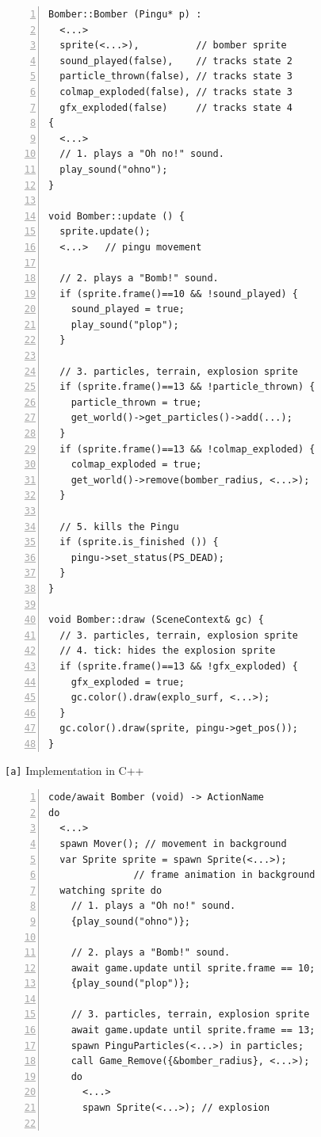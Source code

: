 \documentclass{vgtc}                          %
\newcommand{\code}[1] {{\small{\texttt{#1}}}}
\newcommand{\ax}{\code{[a]}\xspace}
\begin{document}
\begin{figure}[!t]
\begin{minipage}[t]{0.50\linewidth}
\begin{lstlisting}[numbers=left,xleftmargin=3em]
Bomber::Bomber (Pingu* p) :
  <...>
  sprite(<...>),          // bomber sprite
  sound_played(false),    // tracks state 2
  particle_thrown(false), // tracks state 3
  colmap_exploded(false), // tracks state 3
  gfx_exploded(false)     // tracks state 4
{
  <...>
  // 1. plays a "Oh no!" sound.
  play_sound("ohno");
}

void Bomber::update () {
  sprite.update();
  <...>   // pingu movement

  // 2. plays a "Bomb!" sound.
  if (sprite.frame()==10 && !sound_played) {
    sound_played = true;
    play_sound("plop");
  }

  // 3. particles, terrain, explosion sprite
  if (sprite.frame()==13 && !particle_thrown) {
    particle_thrown = true;
    get_world()->get_particles()->add(...);
  }
  if (sprite.frame()==13 && !colmap_exploded) {
    colmap_exploded = true;
    get_world()->remove(bomber_radius, <...>);
  }

  // 5. kills the Pingu
  if (sprite.is_finished ()) {
    pingu->set_status(PS_DEAD);
  }
}

void Bomber::draw (SceneContext& gc) {
  // 3. particles, terrain, explosion sprite
  // 4. tick: hides the explosion sprite
  if (sprite.frame()==13 && !gfx_exploded) {
    gfx_exploded = true;
    gc.color().draw(explo_surf, <...>);
  }
  gc.color().draw(sprite, pingu->get_pos());
}
\end{lstlisting}
\centering\small{\ax Implementation in C++}
\end{minipage}
%
\begin{minipage}[t]{0.50\linewidth}
\begin{lstlisting}[numbers=left,xleftmargin=3em]
code/await Bomber (void) -> ActionName
do
  <...>
  spawn Mover(); // movement in background
  var Sprite sprite = spawn Sprite(<...>);
               // frame animation in background
  watching sprite do
    // 1. plays a "Oh no!" sound.
    {play_sound("ohno")};

    // 2. plays a "Bomb!" sound.
    await game.update until sprite.frame == 10;
    {play_sound("plop")};

    // 3. particles, terrain, explosion sprite
    await game.update until sprite.frame == 13;
    spawn PinguParticles(<...>) in particles;
    call Game_Remove({&bomber_radius}, <...>);
    do
      <...>
      spawn Sprite(<...>); // explosion


\end{lstlisting}
\end{minipage}
\end{figure}
\end{document}
